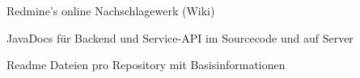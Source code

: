 \begin{frame}
\begin{block}{}
	Redmine's online Nachschlagewerk (Wiki)
\end{block}
\begin{block}{}
	JavaDocs für Backend und Service-API im Sourcecode und auf Server
\end{block}
\begin{block}{}
	Readme Dateien pro Repository mit Basisinformationen
\end{block}
\end{frame}